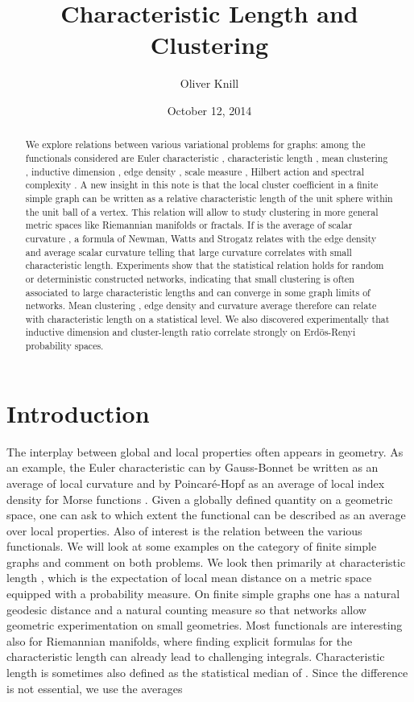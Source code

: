 \documentclass[12pt]{amsart}
\title{Characteristic Length and Clustering}
\author{Oliver Knill}
\date{October 12, 2014}
\theoremstyle{definition}
\begin{document}
\begin{abstract}
We explore relations between various variational problems for graphs: among the functionals 
considered are Euler characteristic , characteristic length , mean clustering , 
inductive dimension , edge density , scale measure ,
Hilbert action  and spectral complexity . A new insight in this note
is that the local cluster coefficient  in a finite simple graph can be written 
as a relative characteristic length  of the unit sphere  within the unit ball 
 of a vertex. This relation  will allow to study clustering 
in more general metric spaces like Riemannian manifolds or fractals. 
If  is the average of scalar curvature , a formula  
of Newman, Watts and Strogatz \cite{NewmanStrogatzWatts} relates  with the edge 
density  and average scalar curvature  telling that large curvature correlates with small characteristic length.
Experiments show that the statistical relation  holds for random or 
deterministic constructed networks, indicating that small clustering is often associated to large 
characteristic lengths and  can converge in some graph limits of networks.
Mean clustering , edge density  and curvature average  therefore can relate 
with characteristic length  on a statistical level.
We also discovered experimentally that inductive dimension  and cluster-length ratio 
 correlate strongly on Erd\"os-Renyi probability spaces. 
\end{abstract} 
\maketitle

\section{Introduction}

The interplay between global and local properties often appears in 
geometry. As an example, the Euler characteristic can by Gauss-Bonnet be written 
as an average of local curvature and by Poincar\'e-Hopf as an average of local index density 
for Morse functions . Given a globally defined quantity on a geometric space, one
can ask to which extent the functional can be described as an average over local properties.
Also of interest is the relation between the various functionals. 
We will look at some examples on the category of finite simple graphs and comment on both 
problems. We look then primarily at characteristic length , which is the expectation of 
local mean distance  on a metric space equipped with a probability measure. 
On finite simple graphs one has a natural geodesic distance and a natural counting measure so that
networks allow geometric experimentation on small geometries. Most functionals are 
interesting also for Riemannian manifolds, where finding explicit formulas for the characteristic length
can already lead to challenging integrals. Characteristic length is sometimes also defined
as the statistical median of  \cite{SmallWorld}. Since the difference is not essential, we use the averages
\end{document}
